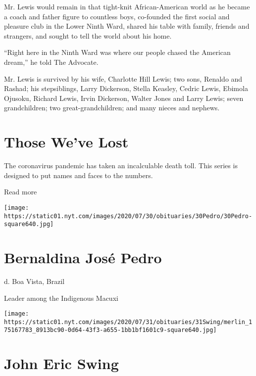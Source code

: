 Mr. Lewis would remain in that tight-knit African-American world as he
became a coach and father figure to countless boys, co-founded the first
social and pleasure club in the Lower Ninth Ward, shared his table with
family, friends and strangers, and sought to tell the world about his
home.

``Right here in the Ninth Ward was where our people chased the American
dream,'' he told The Advocate.

Mr. Lewis is survived by his wife, Charlotte Hill Lewis; two sons,
Renaldo and Rashad; his stepsiblings, Larry Dickerson, Stella Keasley,
Cedric Lewis, Ebimola Ojusoku, Richard Lewis, Irvin Dickerson, Walter
Jones and Larry Lewis; seven grandchildren; two great-grandchildren; and
many nieces and nephews.

\href{https://www.nytimes.com/interactive/2020/obituaries/people-died-coronavirus-obituaries.html?action=click\&pgtype=Article\&state=default\&region=BELOW_MAIN_CONTENT\&context=covid_obits_promo}{}

\hypertarget{those-weve-lost}{%
\section{Those We've Lost}\label{those-weve-lost}}

The coronavirus pandemic has taken an incalculable death toll. This
series is designed to put names and faces to the numbers.

Read more

\texttt{[image: https://static01.nyt.com/images/2020/07/30/obituaries/30Pedro/30Pedro-square640.jpg]}

\hypertarget{bernaldina-josuxe9-pedro}{%
\section{Bernaldina José Pedro}\label{bernaldina-josuxe9-pedro}}

d. Boa Vista, Brazil

Leader among the Indigenous Macuxi

\texttt{[image: https://static01.nyt.com/images/2020/07/31/obituaries/31Swing/merlin\_175167783\_8913bc90-0d64-43f3-a655-1bb1bf1601c9-square640.jpg]}

\hypertarget{john-eric-swing}{%
\section{John Eric Swing}\label{john-eric-swing}}

